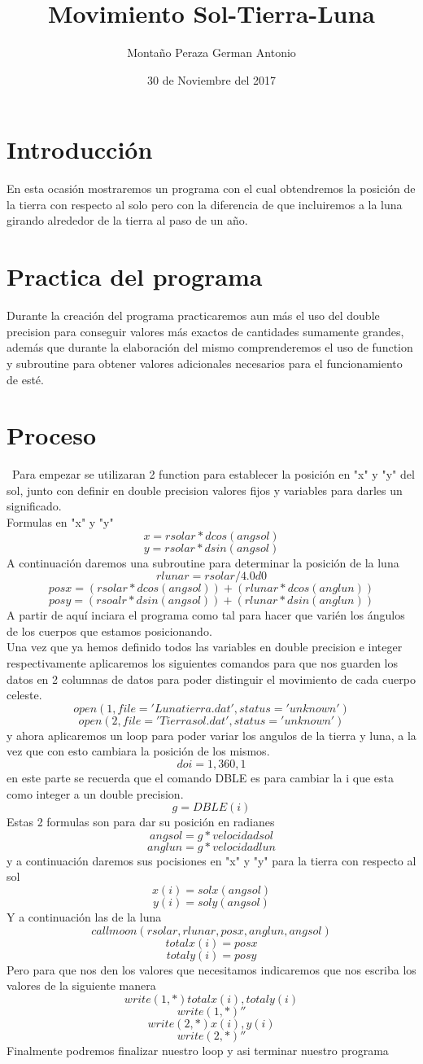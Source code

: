 \documentclass{article}
\date{30 de Noviembre del 2017}
\title{Movimiento Sol-Tierra-Luna}
\author{Montaño Peraza German Antonio}
\begin{document}
\maketitle
\section{Introducción}
En esta ocasión mostraremos un programa con el cual obtendremos la posición de la tierra con respecto al solo pero con la diferencia de que incluiremos a la luna girando alrededor de la tierra al paso de un año.
\section{Practica del programa}
Durante la creación del programa practicaremos aun más el uso del double precision para conseguir valores más exactos de cantidades sumamente grandes, además que durante la elaboración del mismo comprenderemos el uso de function y subroutine para obtener valores adicionales necesarios para el funcionamiento de esté.
\section{Proceso}\
Para empezar se utilizaran 2 function para establecer la posición en "x" y "y" del sol, junto con definir en double precision valores fijos y variables para darles un significado.\\
Formulas en "x" y "y"
\[x=rsolar*dcos(angsol)\]
\[y=rsolar*dsin(angsol)\]
A continuación daremos una subroutine para determinar la posición de la luna
\[rlunar=rsolar/4.0d0\]
\[posx=(rsolar*dcos(angsol))+(rlunar*dcos(anglun))\]
\[posy=(rsoalr*dsin(angsol))+(rlunar*dsin(anglun))\]
A partir de aquí inciara el programa como tal para hacer que varién los ángulos de los cuerpos que estamos posicionando.\\
Una vez que ya hemos definido todos las variables en double precision e integer respectivamente aplicaremos los siguientes comandos para que nos guarden los datos en 2 columnas de datos para poder distinguir el movimiento de cada cuerpo celeste.
\[open(1,file='Lunatierra.dat',status='unknown')\]
\[open(2,file='Tierrasol.dat',status='unknown')\]
y ahora aplicaremos un loop para poder variar los angulos de la tierra y luna, a la vez que con esto cambiara la posición de los mismos.
\[do i=1,360,1\]
en este parte se recuerda que el comando DBLE es para cambiar la i que esta como integer a un double precision.
\[g=DBLE(i)\]
Estas 2 formulas son para dar su posición en radianes
\[angsol=g*velocidadsol\]
\[anglun=g*velocidadlun\]
y a continuación daremos sus pocisiones en "x" y "y" para la tierra con respecto al sol 
\[x(i)=solx(angsol)\]
\[y(i)=soly(angsol)\]
Y a continuación las de la luna
\[call moon(rsolar,rlunar,posx,anglun,angsol)\]
\[totalx(i)=posx\]
\[totaly(i)=posy\]
Pero para que nos den los valores que necesitamos indicaremos que nos escriba los valores de la siguiente manera
\[write(1,*) totalx(i),totaly(i)\]
\[write(1,*)''\]
\[write(2,*) x(i),y(i)\]
\[write(2,*)''\]
Finalmente podremos finalizar nuestro loop y asi terminar nuestro programa
\end{document}
